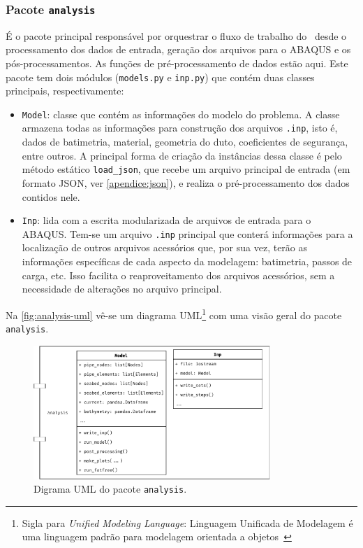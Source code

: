 \subsubsection{Pacote \texttt{analysis}}


É o pacote principal responsável por orquestrar o fluxo de trabalho do \frame\ desde o processamento dos dados de entrada, geração dos arquivos para o ABAQUS e os pós-processamentos.
As funções de pré-processamento de dados estão aqui.
Este pacote tem dois módulos (\texttt{models.py} e \texttt{inp.py}) que contém duas classes principais, respectivamente:

\begin{itemize}
    \item \texttt{Model}: classe que contém as informações do modelo do problema.
    A classe armazena todas as informações para construção dos arquivos \texttt{.inp}, isto é, dados de batimetria, material, geometria do duto, coeficientes de segurança, entre outros.
    A principal forma de criação da instâncias dessa classe é pelo método estático \texttt{load\_json}, que recebe um arquivo principal de entrada (em formato JSON, ver \autoref{apendice:json}), e realiza o pré-processamento dos dados contidos nele.

    \item \texttt{Inp}: lida com a escrita modularizada de arquivos de entrada  para o ABAQUS. Tem-se um arquivo \texttt{.inp} principal que conterá informações para a localização de outros arquivos acessórios que, por sua vez, terão as informações específicas de cada aspecto da modelagem: batimetria, passos de carga, etc. Isso facilita o reaproveitamento dos arquivos acessórios, sem a necessidade de alterações no arquivo principal.
\end{itemize}

Na \autoref{fig:analysis-uml} vê-se um diagrama UML\footnote{Sigla para \textit{Unified Modeling Language}: Linguagem Unificada de Modelagem é uma linguagem padrão para modelagem orientada a objetos~\cite{infoescolauml}} com uma visão geral do pacote \texttt{analysis}.

\begin{figure}[!ht]
    \centering
    \caption{Digrama UML do pacote \texttt{analysis}.}\label{fig:analysis-uml}
    \includegraphics[width=0.8\textwidth]{imagens/analysis-uml}
\end{figure}


